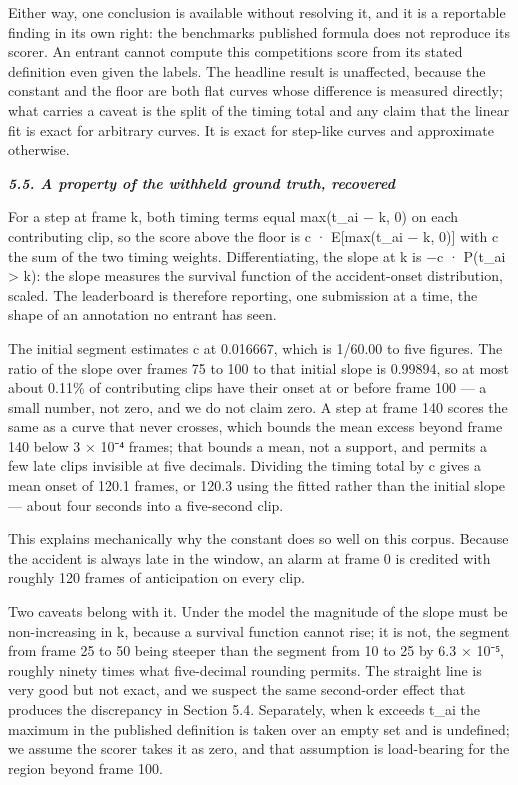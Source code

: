 Either way, one conclusion is available without resolving it, and it is a reportable finding in its own right: the benchmark\textquotesingle s published formula does not reproduce its scorer. An entrant cannot compute this competition\textquotesingle s score from its stated definition even given the labels. The headline result is unaffected, because the constant and the floor are both flat curves whose difference is measured directly; what carries a caveat is the split of the timing total and any claim that the linear fit is exact for arbitrary curves. It is exact for step-like curves and approximate otherwise.

\emph{\textbf{5.5. A property of the withheld ground truth, recovered}}

For a step at frame k, both timing terms equal max(t\_ai − k, 0) on each contributing clip, so the score above the floor is c · E{[}max(t\_ai − k, 0){]} with c the sum of the two timing weights. Differentiating, the slope at k is −c · P(t\_ai \textgreater{} k): the slope measures the survival function of the accident-onset distribution, scaled. The leaderboard is therefore reporting, one submission at a time, the shape of an annotation no entrant has seen.

The initial segment estimates c at 0.016667, which is 1/60.00 to five figures. The ratio of the slope over frames 75 to 100 to that initial slope is 0.99894, so at most about 0.11\% of contributing clips have their onset at or before frame 100 --- a small number, not zero, and we do not claim zero. A step at frame 140 scores the same as a curve that never crosses, which bounds the mean excess beyond frame 140 below 3 × 10⁻⁴ frames; that bounds a mean, not a support, and permits a few late clips invisible at five decimals. Dividing the timing total by c gives a mean onset of 120.1 frames, or 120.3 using the fitted rather than the initial slope --- about four seconds into a five-second clip.

This explains mechanically why the constant does so well on this corpus. Because the accident is always late in the window, an alarm at frame 0 is credited with roughly 120 frames of anticipation on every clip.

Two caveats belong with it. Under the model the magnitude of the slope must be non-increasing in k, because a survival function cannot rise; it is not, the segment from frame 25 to 50 being steeper than the segment from 10 to 25 by 6.3 × 10⁻⁵, roughly ninety times what five-decimal rounding permits. The straight line is very good but not exact, and we suspect the same second-order effect that produces the discrepancy in Section 5.4. Separately, when k exceeds t\_ai the maximum in the published definition is taken over an empty set and is undefined; we assume the scorer takes it as zero, and that assumption is load-bearing for the region beyond frame 100.

